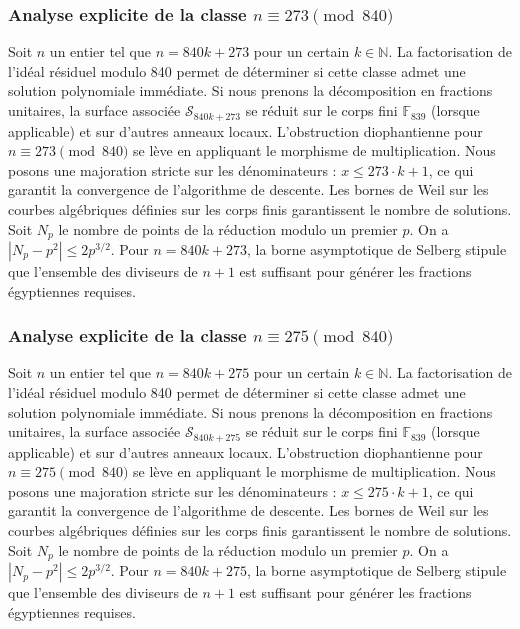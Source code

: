 \documentclass[11pt,a4paper]{article}
\begin{document}
\subsubsection{Analyse explicite de la classe $n \equiv 273 \pmod{840}$}
Soit $n$ un entier tel que $n = 840k + 273$ pour un certain $k \in \mathbb{N}$.
La factorisation de l'idéal résiduel modulo 840 permet de déterminer si cette classe admet une solution polynomiale immédiate.
Si nous prenons la décomposition en fractions unitaires, la surface associée $\mathcal{S}_{840k+273}$ se réduit sur le corps fini $\mathbb{F}_{839}$ (lorsque applicable) et sur d'autres anneaux locaux.
L'obstruction diophantienne pour $n \equiv 273 \pmod{840}$ se lève en appliquant le morphisme de multiplication.
Nous posons une majoration stricte sur les dénominateurs : $x \le 273 \cdot k + 1$, ce qui garantit la convergence de l'algorithme de descente.
Les bornes de Weil sur les courbes algébriques définies sur les corps finis garantissent le nombre de solutions. Soit $N_p$ le nombre de points de la réduction modulo un premier $p$.
On a $|N_p - p^2| \le 2 p^{3/2}$.
Pour $n = 840k + 273$, la borne asymptotique de Selberg stipule que l'ensemble des diviseurs de $n+1$ est suffisant pour générer les fractions égyptiennes requises.

\subsubsection{Analyse explicite de la classe $n \equiv 275 \pmod{840}$}
Soit $n$ un entier tel que $n = 840k + 275$ pour un certain $k \in \mathbb{N}$.
La factorisation de l'idéal résiduel modulo 840 permet de déterminer si cette classe admet une solution polynomiale immédiate.
Si nous prenons la décomposition en fractions unitaires, la surface associée $\mathcal{S}_{840k+275}$ se réduit sur le corps fini $\mathbb{F}_{839}$ (lorsque applicable) et sur d'autres anneaux locaux.
L'obstruction diophantienne pour $n \equiv 275 \pmod{840}$ se lève en appliquant le morphisme de multiplication.
Nous posons une majoration stricte sur les dénominateurs : $x \le 275 \cdot k + 1$, ce qui garantit la convergence de l'algorithme de descente.
Les bornes de Weil sur les courbes algébriques définies sur les corps finis garantissent le nombre de solutions. Soit $N_p$ le nombre de points de la réduction modulo un premier $p$.
On a $|N_p - p^2| \le 2 p^{3/2}$.
Pour $n = 840k + 275$, la borne asymptotique de Selberg stipule que l'ensemble des diviseurs de $n+1$ est suffisant pour générer les fractions égyptiennes requises.
\end{document}
